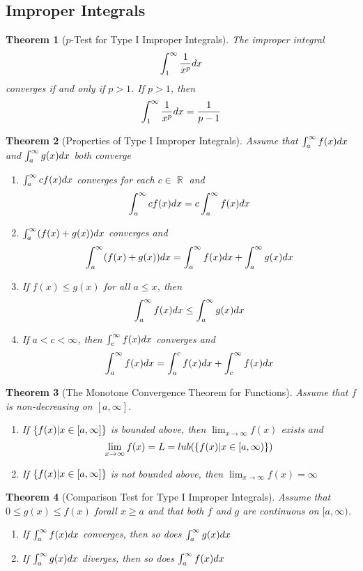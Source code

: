 \documentclass[10pt]{article}
\DeclareMathOperator{\R}{{\mathbb{R}}}
\theoremstyle{break}
\newtheorem{thm}{Theorem}[subsection]
\begin{document}
\subsection{Improper Integrals}
\begin{thm}[$p$-Test for Type I Improper Integrals]
    The improper integral $$\int^\infty_1 \dfrac{1}{x^p} \space dx$$ converges if and only if $p > 1$. If $p > 1$, then $$\int^\infty_1 \dfrac{1}{x^p} \space dx = \dfrac{1}{p-1}$$
\end{thm}
\begin{thm}[Properties of Type I Improper Integrals]
    Assume that $\int^\infty_a f(x) \space dx$  and $\int^\infty_a g(x) \space dx$ both converge
    \begin{enumerate}
        \item $\int^\infty_a cf(x) \space dx$ converges for each $c \in \R$ and  $$\int^\infty_a cf(x) \space dx = c \int^\infty_a f(x) \space dx$$
        \item $\int^\infty_a (f(x) + g(x)) \space dx $ converges and $$\int^\infty_a (f(x) + g(x)) \space dx  = \int^\infty_a f(x)\space dx + \int^\infty_a g(x) \space dx$$
        \item If $f(x) \le g(x) $ for all $a \le x$, then $$\int^\infty_a f(x)\space dx \le \int^\infty_a g(x) \space dx$$
        \item If $a < c< \infty $, then $\int^\infty_c f(x) \space dx$ converges and $$\int^\infty_a f(x)\space dx = \int^c_a f(x)\space dx  + \int^\infty_c f(x)\space dx$$
    \end{enumerate}
\end{thm}
\begin{thm}[The Monotone Convergence Theorem for Functions]
    Assume that $f$ is non-decreasing on $[a, \infty]$.
    \begin{enumerate}
        \item If $\{f(x) \space | \space  x \in [a, \infty]\}$ is bounded above, then $\lim_{x \to \infty}f(x)$ exists and $$\lim_{x \to \infty} f(x) = L = lub(\{f(x) \space | \space  x \in [a, \infty)\})$$
        \item If $\{f(x) \space | \space  x \in [a, \infty]\}$ is not bounded above, then $\lim_{x \to \infty} f(x) = \infty$
    \end{enumerate}
\end{thm}
\begin{thm}[Comparison Test for Type I Improper Integrals]
    Assume that $0\le g(x)\le f(x)$ forall $x\ge a$ and that both $f$ and $g$ are continuous on $[a, \infty)$.
    \begin{enumerate}
        \item If $\int^{\infty}_a f(x) \space dx $ converges, then so does $\int^\infty_a g(x) \space dx$
        \item If $\int^\infty_a g(x) \space dx$ diverges, then so does $\int^{\infty}_a f(x) \space dx$
    \end{enumerate}
\end{thm}
\end{document}
